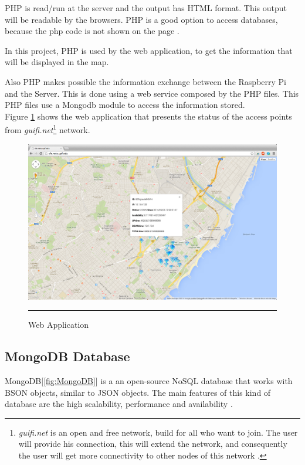 \documentclass[12pt, a4paper,twoside]{tesi_upf}
\begin{document}
                PHP is read/run at the server and the output has HTML format. This output will be readable by the browsers. PHP is a good option to access databases, because the php code is not shown on the page \cite{php}.
                
                In this project, PHP is used by the web application, to get the information that will be displayed in the map.
                 
                Also PHP makes possible the information exchange between the Raspberry Pi and the Server. This is done using a web service composed by the PHP files. This PHP files use a Mongodb module to access the information stored.\\


Figure \ref{fig:wapp} shows the web application that presents the status of the access points from \textit{guifi.net}\footnote{\textit{guifi.net} is an open and free network, build for all who want to join. The user will provide his connection, this will extend the network, and consequently the user will get more connectivity to other nodes of this network \cite{guifinet}.} network.

        \begin{figure}[htbp]
          \centering
              \includegraphics[scale=0.3]{./figures/WebApplication.png}
              \rule{32em}{0.5pt}
          \caption[Web Application]{Web Application}
          \label{fig:wapp}
        \end{figure}
        
        
        \subsection{MongoDB Database}
        \label{mongosection}
        MongoDB[\ref{fig:MongoDB}] is a an open-source NoSQL database that works with BSON objects, similar to JSON objects. The main features of this kind of database are the high scalability, performance and availability \cite{mongo}.
        
\end{document}
